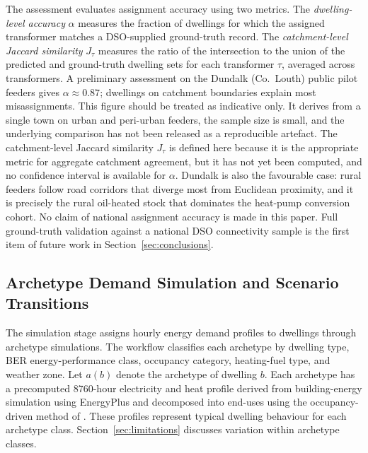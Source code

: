 \documentclass[preprint,12pt]{elsarticle}
\begin{document}
The assessment evaluates assignment accuracy using two metrics.
The \emph{dwelling-level accuracy} $\alpha$ measures the fraction of
dwellings for which the assigned transformer matches a DSO-supplied
ground-truth record.
The \emph{catchment-level Jaccard similarity} $J_\tau$ measures the ratio of
the intersection to the union of the predicted and ground-truth dwelling
sets for each transformer $\tau$, averaged across transformers.
A preliminary assessment on the Dundalk (Co.~Louth) public pilot feeders
gives $\alpha \approx 0.87$; dwellings on catchment boundaries explain most
misassignments.
This figure should be treated as indicative only. It derives from a single
town on urban and peri-urban feeders, the sample size is small, and the
underlying comparison has not been released as a reproducible artefact.
The catchment-level Jaccard similarity $J_\tau$ is defined here because it
is the appropriate metric for aggregate catchment agreement, but it has not
yet been computed, and no confidence interval is available for $\alpha$.
Dundalk is also the favourable case: rural feeders follow road corridors
that diverge most from Euclidean proximity, and it is precisely the rural
oil-heated stock that dominates the heat-pump conversion cohort.
No claim of national assignment accuracy is made in this paper.
Full ground-truth validation against a national DSO connectivity sample is
the first item of future work in Section~\ref{sec:conclusions}.

\subsection{Archetype Demand Simulation and Scenario Transitions}
\label{sec:simulation}

The simulation stage assigns hourly energy demand profiles to dwellings
through archetype simulations.
The workflow classifies each archetype by dwelling type, BER
energy-performance class, occupancy category, heating-fuel type, and weather
zone.
Let $a(b)$ denote the archetype of dwelling $b$.
Each archetype has a precomputed 8760-hour electricity and heat profile
derived from building-energy simulation using EnergyPlus and decomposed into
end-uses using the occupancy-driven method of \cite{sood_quantifying_2025}.
These profiles represent typical dwelling behaviour for each archetype
class.
Section~\ref{sec:limitations} discusses variation within archetype classes.
\end{document}
